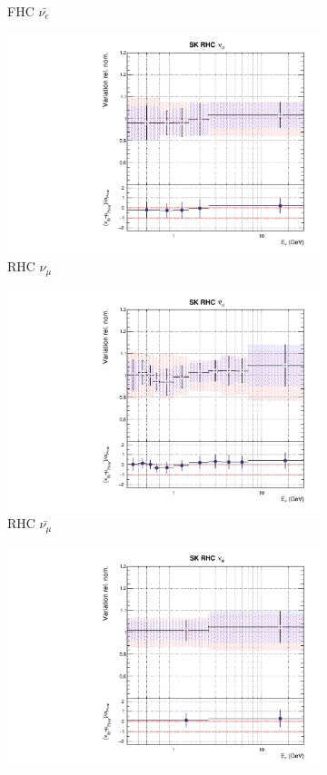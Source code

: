 \begin{figure}[t]
\begin{subfigure}{0.42\textwidth}
  \caption{\SK FHC $\bar{\nu_e}$}
\end{subfigure}
\begin{subfigure}{0.42\textwidth}
  \centering
  \includegraphics[width=0.75\linewidth]{figs/rhcmpdat248flux_12}
  \caption{\SK RHC $\nu_{\mu}$}
\end{subfigure}
\begin{subfigure}{0.42\textwidth}
  \centering
  \includegraphics[width=0.75\linewidth]{figs/rhcmpdat248flux_13}
  \caption{\SK RHC $\bar{\nu_{\mu}}$}
\end{subfigure}
\begin{subfigure}{0.42\textwidth}
  \centering
  \includegraphics[width=0.75\linewidth]{figs/rhcmpdat248flux_14}

\end{subfigure}
\end{figure}
